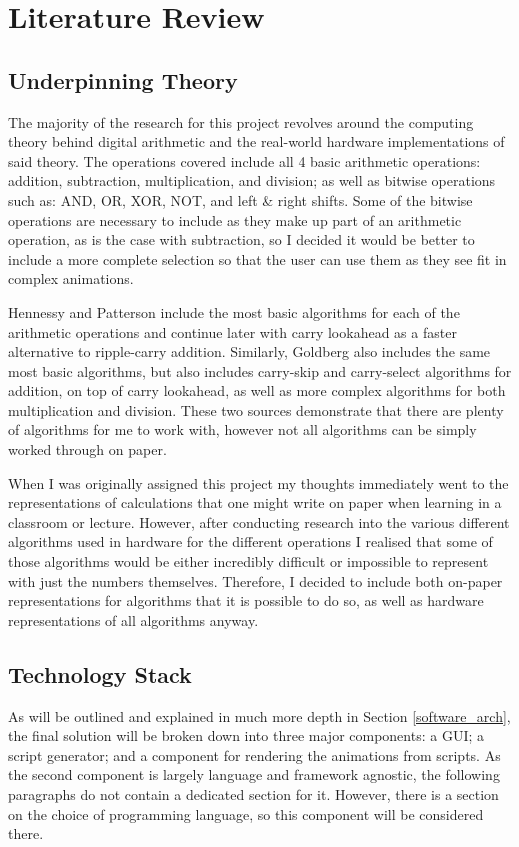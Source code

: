 \documentclass{report}
\begin{document}
\chapter{Literature Review}

\section{Underpinning Theory}
The majority of the research for this project revolves around the computing
theory behind digital arithmetic and the real-world hardware implementations of
said theory. The operations covered include all 4 basic arithmetic operations:
addition, subtraction, multiplication, and division; as well as bitwise
operations such as: AND, OR, XOR, NOT, and left \& right shifts. Some of the
bitwise operations are necessary to include as they make up part of an
arithmetic operation, as is the case with subtraction, so I decided it would be
better to include a more complete selection so that the user can use them as
they see fit in complex animations.

Hennessy and Patterson \cite[Ch.~3]{alma991009658349802746} include the most
basic algorithms for each of the arithmetic operations and continue later with
carry lookahead \cite[Appendix B, Sec.~B.6]{alma991009658349802746} as a faster
alternative to ripple-carry addition. Similarly, Goldberg \cite{goldberg} also
includes the same most basic algorithms, but also includes carry-skip and
carry-select algorithms for addition, on top of carry lookahead, as well as
more complex algorithms for both multiplication and division. These two sources
demonstrate that there are plenty of algorithms for me to work with, however
not all algorithms can be simply worked through on paper.

When I was originally assigned this project my thoughts immediately went to the
representations of calculations that one might write on paper when learning in
a classroom or lecture. However, after conducting research into the various
different algorithms used in hardware for the different operations I realised
that some of those algorithms would be either incredibly difficult or
impossible to represent with just the numbers themselves. Therefore, I decided
to include both on-paper representations for algorithms that it is possible to
do so, as well as hardware representations of all algorithms anyway.

\section{Technology Stack} \label{tech_stack}
As will be outlined and explained in much more depth in Section
\ref{software_arch}, the final solution will be broken down into three major
components: a GUI; a script generator; and a component for rendering the
animations from scripts. As the second component is largely language and
framework agnostic, the following paragraphs do not contain a dedicated section
for it. However, there is a section on the choice of programming language, so
this component will be considered there.
\end{document}
